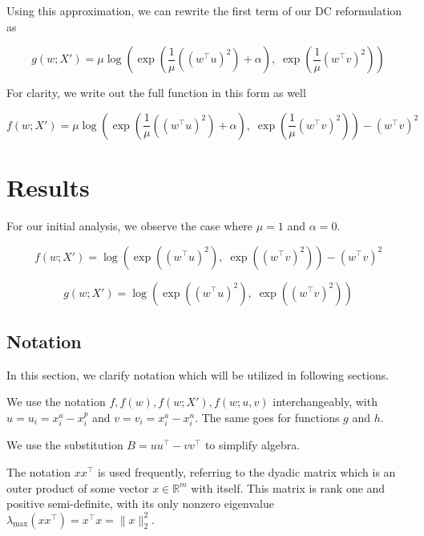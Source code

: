 \documentclass[11pt]{article}
\begin{document}
Using this approximation, we can rewrite the first term of our DC reformulation as

\begin{equation}
    g(w; X') = \mu \log(\exp(\frac{1}{\mu}((w^{\top} u)^2) + \alpha), \; \exp(\frac{1}{\mu}(w^{\top} v)^2))
\end{equation}

For clarity, we write out the full function in this form as well

\begin{equation}
\label{eq:full_smooth_margin_f}
    f(w; X') = \mu \log(\exp(\frac{1}{\mu}((w^{\top} u)^2) + \alpha), \; \exp(\frac{1}{\mu}(w^{\top} v)^2)) - (w^{\top} v)^2
\end{equation}

\section{Results}

For our initial analysis, we observe the case where $\mu = 1$ and $\alpha = 0$.

\begin{equation}
\label{eq:final_smooth_f}
    f(w; X') = \log(\exp((w^{\top} u)^2), \; \exp((w^{\top} v)^2)) - (w^{\top} v)^2 
\end{equation}

\begin{equation}
\label{eq:final_smooth_g}
    g(w; X') = \log(\exp((w^{\top} u)^2), \; \exp((w^{\top} v)^2))
\end{equation}

\subsection{Notation}

In this section, we clarify notation which will be utilized in following sections.

We use the notation $f, f(w), f(w; X'), f(w; u, v)$ interchangeably, with $u = u_i = x_i^a - x_i^p$ and $v = v_i = x_i^a - x_i^n$. The same goes for functions $g$ and $h$.

We use the substitution $B = uu^{\top} - vv^{\top}$ to simplify algebra.

The notation $xx^{\top}$ is used frequently, referring to the dyadic matrix which is an outer product of some vector $x \in \mathbb{R}^m$ with itself. This matrix is rank one and positive semi-definite, with its only nonzero eigenvalue $\lambda_{\max}(xx^{\top}) = x^{\top}x = \|x\|_2^2$.
\end{document}

